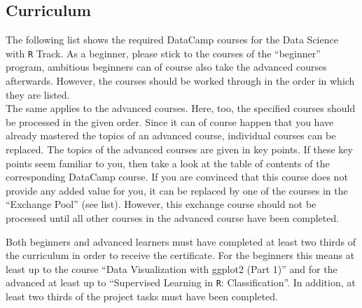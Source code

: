 \documentclass[
  11pt,
]{book}
\begin{document}
\hypertarget{curriculum}{%
\subsection{Curriculum}\label{curriculum}}

The following list shows the required DataCamp courses for the Data Science with \texttt{R} Track. As a beginner, please stick to the courses of the ``beginner'' program, ambitious beginners can of course also take the advanced courses afterwards. However, the courses should be worked through in the order in which they are listed.\\
The same applies to the advanced courses. Here, too, the specified courses should be processed in the given order. Since it can of course happen that you have already mastered the topics of an advanced course, individual courses can be replaced. The topics of the advanced courses are given in key points. If these key points seem familiar to you, then take a look at the table of contents of the corresponding DataCamp course. If you are convinced that this course does not provide any added value for you, it can be replaced by one of the courses in the ``Exchange Pool'' (see list). However, this exchange course should not be processed until all other courses in the advanced course have been completed.

Both beginners and advanced learners must have completed at least two thirds of the curriculum in order to receive the certificate. For the beginners this means at least up to the course ``Data Visualization with ggplot2 (Part 1)'' and for the advanced at least up to ``Supervised Learning in \texttt{R}: Classification''. In addition, at least two thirds of the project tasks must have been completed.
\end{document}
